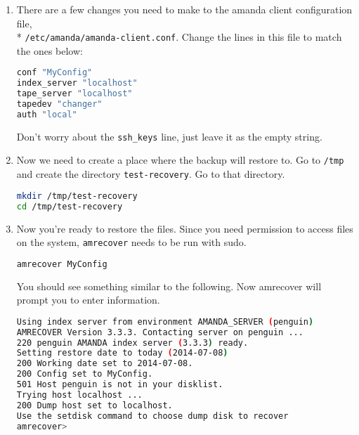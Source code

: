 \documentclass{article}
\begin{document}
\begin{enumerate}

\item There are a few changes you need to make to the amanda client configuration file, \\* \verb|/etc/amanda/amanda-client.conf|. Change the lines in this file to match the ones below:

\begin{lstlisting}[basicstyle=\ttfamily, backgroundcolor = \color{lightgray}, language = bash, xleftmargin = 0cm, framexleftmargin = 1em]
conf "MyConfig"
index_server "localhost"
tape_server "localhost"
tapedev "changer"
auth "local"
\end{lstlisting}

Don't worry about the \verb|ssh_keys| line, just leave it as the empty string.

\item Now we need to create a place where the backup will restore to. Go to \verb|/tmp| and create the directory \verb|test-recovery|. Go to that directory.

\begin{lstlisting}[basicstyle=\ttfamily, backgroundcolor = \color{lightgray}, language = bash, xleftmargin = 0cm, framexleftmargin = 1em]
mkdir /tmp/test-recovery
cd /tmp/test-recovery
\end{lstlisting}

\item Now you're ready to restore the files. Since you need permission to access files on the system, \verb|amrecover| needs to be run with sudo.

\begin{lstlisting}[basicstyle=\ttfamily, backgroundcolor = \color{lightgray}, language = bash, xleftmargin = 0cm, framexleftmargin = 1em]
amrecover MyConfig
\end{lstlisting}

You should see something similar to the following. Now amrecover will prompt you to enter information.

\begin{lstlisting}[basicstyle=\ttfamily, backgroundcolor = \color{lightgray}, language = bash, xleftmargin = 0cm, framexleftmargin = 1em]
Using index server from environment AMANDA_SERVER (penguin)
AMRECOVER Version 3.3.3. Contacting server on penguin ...
220 penguin AMANDA index server (3.3.3) ready.
Setting restore date to today (2014-07-08)
200 Working date set to 2014-07-08.
200 Config set to MyConfig.
501 Host penguin is not in your disklist.
Trying host localhost ...
200 Dump host set to localhost.
Use the setdisk command to choose dump disk to recover
amrecover>
\end{lstlisting}


\end{enumerate}
\end{document}
